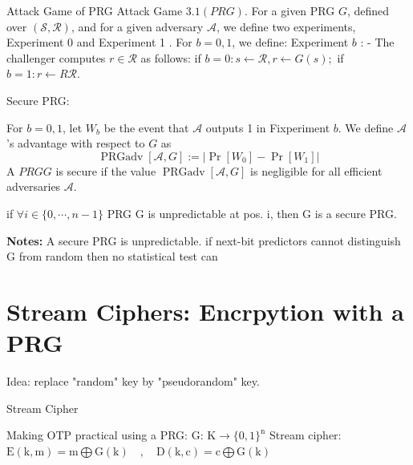 \begin{method}  Attack Game of PRG
    Attack Game $3.1(P R G)$. For a given PRG $G$, defined over $(\mathcal{S}, \mathcal{R})$, and for a given adversary $\mathcal{A}$, we define two experiments, Experiment 0 and Experiment 1 . For $b=0,1$, we define:
    Experiment $b$ :
    - The challenger computes $r \in \mathcal{R}$ as follows:
    if $b=0: s \longleftarrow \mathcal{R}, r \leftarrow G(s) ;$
    if $b=1: r \longleftarrow{R} \mathcal{R}$.

\end{method}

\begin{definition}  Secure PRG:

    For $b=0,1$, let $W_{b}$ be the event that $\mathcal{A}$ outputs 1 in Fixperiment $b$. We define $\mathcal{A}$ 's advantage with respect to $G$ as
    $$
    \operatorname{PRGadv}[\mathcal{A}, G]:=\left|\operatorname{Pr}\left[W_{0}\right]-\operatorname{Pr}\left[W_{1}\right]\right|
    $$
    A $P R G G$ is secure if the value $\operatorname{PRGadv}[\mathcal{A}, G]$ is negligible for all efficient adversaries $\mathcal{A}$.
    
\end{definition}

\begin{theorem} 

    if $\forall i \in \{0,\cdots,n-1\}$ PRG G is unpredictable at pos. i, then G is a secure PRG.
    
\end{theorem}

\textbf{Notes:} A secure PRG is unpredictable. if next-bit predictors cannot distinguish G from random then no statistical test can


\section{Stream Ciphers: Encrpytion with a PRG}

Idea:  replace "random" key by "pseudorandom" key.

\begin{method}  Stream Cipher

    Making OTP practical using a PRG:
    G: $\mathrm{K} \longrightarrow\{0,1\}^{\mathrm{n}}$
    Stream cipher:
    $\mathrm{E}(\mathrm{k}, \mathrm{m})=\mathrm{m} \bigoplus \mathrm{G}(\mathrm{k}) \quad, \quad \mathrm{D}(\mathrm{k}, \mathrm{c})=\mathrm{c} \bigoplus \mathrm{G}(\mathrm{k})$

\end{method}

